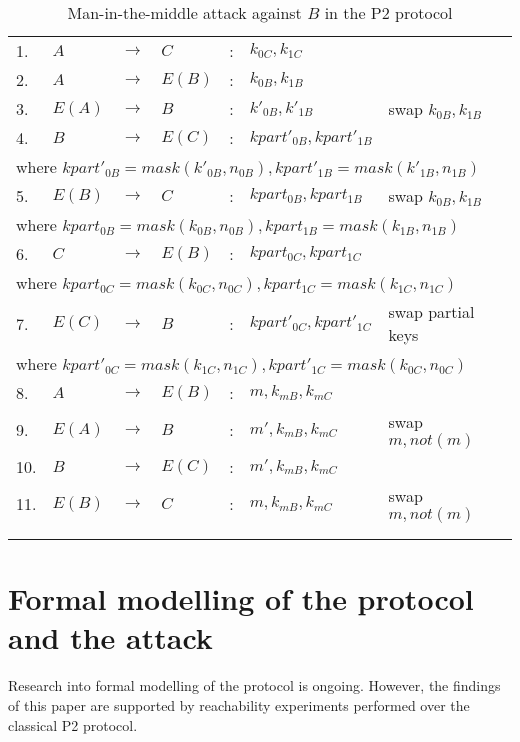 \documentclass[english]{article}
\providecommand{\tabularnewline}{\\}
\begin{document}
\begin{table}
\begin{tabular}{llllllll}
1. & $A$ & $\longrightarrow$ & $C$ & : & $k_{0C},k_{1C}$ &  & \tabularnewline
2. & $A$ & $\longrightarrow$ & $E\left(B\right)$ & : & $k_{0B},k_{1B}$ &  & \tabularnewline
3. & $E\left(A\right)$ & $\longrightarrow$ & $B$ & : & $k'_{0B},k'_{1B}$ & swap $k_{0B},k_{1B}$ & \tabularnewline
4. & $B$ & $\longrightarrow$ & $E\left(C\right)$ & : & $kpart'_{0B},kpart'_{1B}$ &  & \tabularnewline
\multicolumn{7}{l}{where $kpart'_{0B}=mask\left(k'_{0B},n_{0B}\right),kpart'_{1B}=mask\left(k'_{1B},n_{1B}\right)$} & \tabularnewline
5. & $E\left(B\right)$ & $\longrightarrow$ & $C$ & : & $kpart_{0B},kpart_{1B}$ & swap $k_{0B},k_{1B}$ & \tabularnewline
\multicolumn{7}{l}{where $kpart_{0B}=mask\left(k{}_{0B},n_{0B}\right),kpart_{1B}=mask\left(k{}_{1B},n_{1B}\right)$} & \tabularnewline
6. & $C$ & $\longrightarrow$ & $E\left(B\right)$ & : & $kpart_{0C},kpart_{1C}$ &  & \tabularnewline
\multicolumn{7}{l}{where $kpart_{0C}=mask\left(k{}_{0C},n_{0C}\right),kpart_{1C}=mask\left(k{}_{1C},n_{1C}\right)$} & \tabularnewline
7. & $E\left(C\right)$ & $\longrightarrow$ & $B$ & : & $kpart'_{0C},kpart'_{1C}$ & swap partial keys & \tabularnewline
\multicolumn{7}{l}{where $kpart'_{0C}=mask\left(k{}_{1C},n_{1C}\right),kpart'_{1C}=mask\left(k{}_{0C},n_{0C}\right)$} & \tabularnewline
8. & $A$ & $\longrightarrow$ & $E\left(B\right)$ & : & $m,k_{mB},k_{mC}$ &  & \tabularnewline
9. & $E\left(A\right)$ & $\longrightarrow$ & $B$ & : & $m',k_{mB},k_{mC}$ & swap $m,not\left(m\right)$ & \tabularnewline
10. & $B$ & $\longrightarrow$ & $E\left(C\right)$ & : & $m',k_{mB},k_{mC}$ &  & \tabularnewline
11. & $E\left(B\right)$ & $\longrightarrow$ & $C$ & : & $m,k_{mB},k_{mC}$ & swap $m,not\left(m\right)$ & \tabularnewline
 &  &  &  &  &  &  & \tabularnewline
 &  &  &  &  &  &  & \tabularnewline
\end{tabular}

\caption{\label{tab:Man-in-the-middle-attack-against}Man-in-the-middle attack
against $B$ in the P2 protocol}


\end{table}



\section{Formal modelling of the protocol and the attack}

Research into formal modelling of the protocol is ongoing. However,
the findings of this paper are supported by reachability experiments
performed over the classical P2 protocol.
\end{document}
